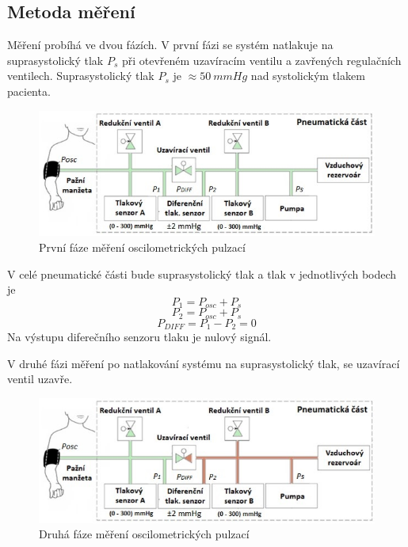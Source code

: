 \subsection{Metoda měření}
Měření probíhá ve dvou fázích. V první fázi se systém natlakuje na suprasystolický tlak $P_s$ při otevřeném uzavíracím ventilu a zavřených regulačních ventilech. Suprasystolický tlak $P_s$ je $\approx 50 \ mmHg$ nad systolickým tlakem pacienta.
\begin{figure}[H]
    \includegraphics[width=1\linewidth]{pictures/faze_mereni_1.jpg}
    \caption{První fáze měření oscilometrických pulzací \cite{cite:Habilitace}}
\end{figure}
V celé pneumatické části bude suprasystolický tlak a tlak v jednotlivých bodech je
\begin{equation*}
    P_1 = P_{osc} + P_s
\end{equation*}
\begin{equation*}
    P_2 = P_{osc} + P_s
\end{equation*}
\begin{equation*}
    P_{DIFF} = P_1 - P_2 = 0
\end{equation*}
Na výstupu diferečního senzoru tlaku je nulový signál. \par
V druhé fázi měření po natlakování systému na suprasystolický tlak, se uzavírací ventil uzavře.
\begin{figure}[H]
    \includegraphics[width=1\linewidth]{pictures/faze_mereni_2.jpg}
    \caption{Druhá fáze měření oscilometrických pulzací \cite{cite:Habilitace}}
\end{figure}
